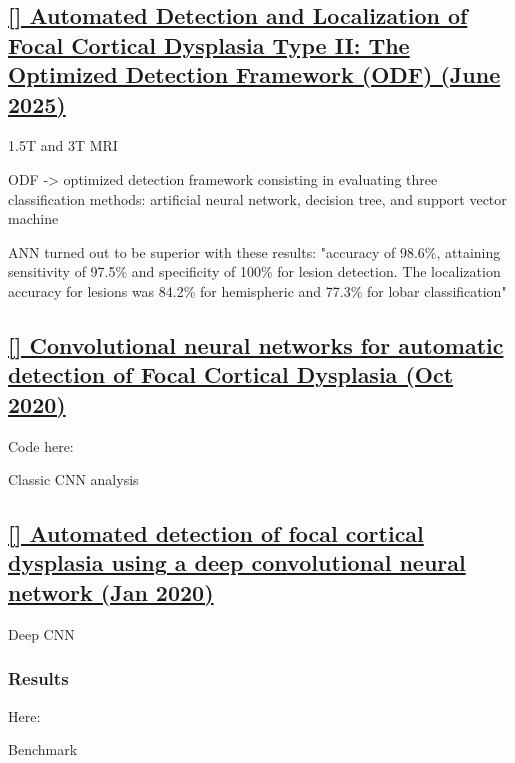 \newpage
\subsection{\href{https://www.sciencedirect.com/science/article/pii/S1878875025003651}{[] Automated Detection and Localization of Focal Cortical Dysplasia Type II: The Optimized Detection Framework (ODF) (June 2025)}}
\label{res15}

1.5T and 3T MRI

ODF -> optimized detection framework consisting in evaluating three classification methods: artificial neural network, decision tree, and support vector machine

ANN turned out to be superior with these results: "accuracy of 98.6\%, attaining sensitivity of 97.5\% and specificity of 100\% for lesion detection. The localization accuracy for lesions was 84.2\% for hemispheric and 77.3\% for lobar classification"

\newpage
\subsection{\href{https://www.researchgate.net/publication/344780032_Convolutional_neural_networks_for_automatic_detection_of_Focal_Cortical_Dysplasia}{[] Convolutional neural networks for automatic detection of Focal Cortical Dysplasia (Oct 2020)}}
\label{res16}

Code here: 

Classic CNN analysis

\newpage
\subsection{\href{https://www.sciencedirect.com/science/article/pii/S0895611118304610}{[] Automated detection of focal cortical dysplasia using a deep convolutional neural network (Jan 2020)}}
\label{res17}

Deep CNN

\subsubsection{Results}

Here: 

\begin{table}[htbp]
	\centering
	\caption{Benchmark}

	\caption{Results from }%
	\label{tab:res17}
\end{table}

